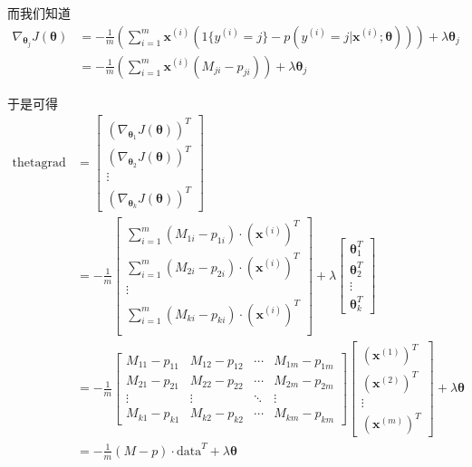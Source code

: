 \documentclass[a4paper,UTF8]{ctexart}
\theoremstyle{plain} \newtheorem{theorem}{定理}[section]
\theoremstyle{plain} \newtheorem{definition}{定义}[section]
\theoremstyle{plain} \newtheorem{lemma}{引理}[section]
\theoremstyle{plain} \newtheorem{proposition}{命题}[section]
\theoremstyle{plain} \newtheorem{example}{例}[section]
\theoremstyle{plain} \newtheorem{remark}{注}[section]
\theoremstyle{plain} \newtheorem{corollary}{推论}[section]
\begin{document}
而我们知道
\begin{align*}
\nabla_{\bm{\theta}_{j}} J(\bm{\theta}) & = - \frac{1}{m} \left( \sum_{i=1}^{m} \bm{x}^{(i)} \left( 1\{y^{(i)}=j\} - p(y^{(i)} = j | \bm{x}^{(i)}; \bm{\theta}) \right) \right) + \lambda \bm{\theta}_{j} \\ 
& = - \frac{1}{m} \left( \sum_{i=1}^{m} \bm{x}^{(i)} \left( M_{ji} - p_{ji} \right) \right) + \lambda \bm{\theta}_{j}
\end{align*}

于是可得
\begin{align*}
\mathrm{thetagrad} & = 
\begin{bmatrix}
(\nabla_{\bm{\theta}_{1}} J(\bm{\theta}))^{T} \\ 
(\nabla_{\bm{\theta}_{2}} J(\bm{\theta}))^{T} \\
\vdots \\ 
(\nabla_{\bm{\theta}_{k}} J(\bm{\theta}))^{T} 
\end{bmatrix} \\ 
& = 
- \frac{1}{m} 
\begin{bmatrix}
\sum_{i=1}^{m} (M_{1i} - p_{1i}) \cdot (\bm{x}^{(i)})^{T} \\ 
\sum_{i=1}^{m} (M_{2i} - p_{2i}) \cdot (\bm{x}^{(i)})^{T} \\
\vdots \\ 
\sum_{i=1}^{m} (M_{ki} - p_{ki}) \cdot (\bm{x}^{(i)})^{T} \\
\end{bmatrix}
+ \lambda 
\begin{bmatrix}
\bm{\theta}_{1}^{T} \\ 
\bm{\theta}_{2}^{T} \\ 
\vdots \\ 
\bm{\theta}_{k}^{T}
\end{bmatrix} \\ 
& = - \frac{1}{m} 
\begin{bmatrix}
M_{11} - p_{11} & M_{12} - p_{12}  & \cdots & M_{1m} - p_{1m} \\ 
M_{21} - p_{21} & M_{22} - p_{22}  & \cdots & M_{2m} - p_{2m} \\ 
\vdots & \vdots & \ddots & \vdots \\ 
M_{k1} - p_{k1} & M_{k2} - p_{k2}  & \cdots & M_{km} - p_{km}
\end{bmatrix} 
\begin{bmatrix}
(\bm{x}^{(1)})^{T} \\ 
(\bm{x}^{(2)})^{T} \\ 
\vdots \\ 
(\bm{x}^{(m)})^{T}
\end{bmatrix}
+ \lambda \bm{\theta} \\ 
& = - \frac{1}{m} (M - p) \cdot \mathrm{data}^{T} + \lambda \bm{\theta}
\end{align*}
\end{document}
